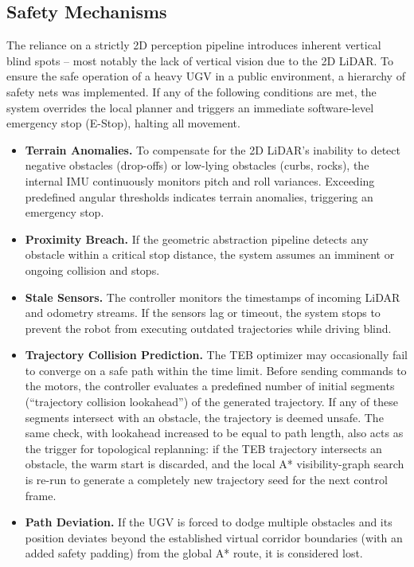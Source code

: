 \subsection{Safety Mechanisms}
\label{subsec:safety-mechanisms}

The reliance on a strictly 2D perception pipeline introduces inherent vertical blind spots -- most notably the lack of vertical vision due to the 2D LiDAR. To ensure the safe operation of a heavy UGV in a public environment, a hierarchy of safety nets was implemented. If any of the following conditions are met, the system overrides the local planner and triggers an immediate software-level emergency stop (E-Stop), halting all movement.

\begin{itemize}
    \item \textbf{Terrain Anomalies.} To compensate for the 2D LiDAR's inability to detect negative obstacles (drop-offs) or low-lying obstacles (curbs, rocks), the internal IMU continuously monitors pitch and roll variances. Exceeding predefined angular thresholds indicates terrain anomalies, triggering an emergency stop.
    \item \textbf{Proximity Breach.} If the geometric abstraction pipeline detects any obstacle within a critical stop distance, the system assumes an imminent or ongoing collision and stops.
    \item \textbf{Stale Sensors.} The controller monitors the timestamps of incoming LiDAR and odometry streams. If the sensors lag or timeout, the system stops to prevent the robot from executing outdated trajectories while driving blind.
    \item \textbf{Trajectory Collision Prediction.} The TEB optimizer may occasionally fail to converge on a safe path within the time limit. Before sending commands to the motors, the controller evaluates a predefined number of initial segments (``trajectory collision lookahead'') of the generated trajectory. If any of these segments intersect with an obstacle, the trajectory is deemed unsafe. The same check, with lookahead increased to be equal to path length, also acts as the trigger for topological replanning: if the TEB trajectory intersects an obstacle, the warm start is discarded, and the local A* visibility-graph search is re-run to generate a completely new trajectory seed for the next control frame.
    \item \textbf{Path Deviation.} If the UGV is forced to dodge multiple obstacles and its position deviates beyond the established virtual corridor boundaries (with an added safety padding) from the global A* route, it is considered lost.

\end{itemize}
